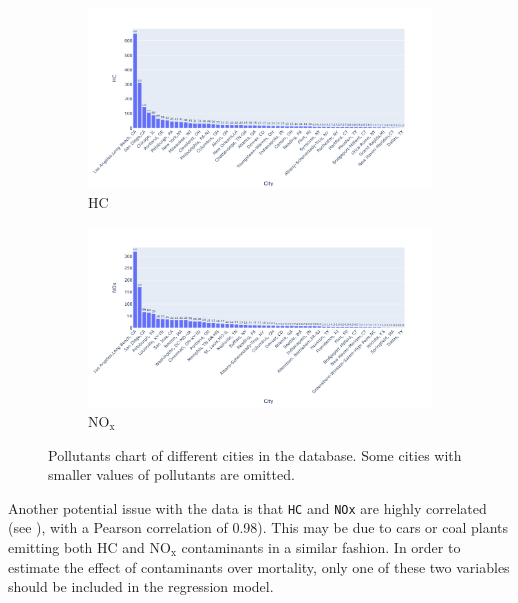 \documentclass[11pt, english]{article}
\begin{document}
\begin{figure}[H]
	\begin{subfigure}[b]{\textwidth}
         \centering
         \includegraphics[width=\textwidth]{HC_chart}
         \caption{HC}
         \label{fig:HC}
    \end{subfigure}
    
	\begin{subfigure}[b]{\textwidth}
         \centering
         \includegraphics[width=\textwidth]{NOx_chart}
         \caption{$\text{NO}_{\text{x}}$}
         \label{fig:NOx}
    \end{subfigure}
	\caption{Pollutants chart of different cities in the database. Some cities with smaller values of pollutants are omitted.}
\end{figure}


Another potential issue with the data is that \texttt{HC} and
\texttt{NOx} are highly correlated (see ), with a Pearson correlation of 0.98). This may be due to cars or coal plants emitting both HC and NO$_{\text{x}}$ contaminants in a similar fashion. In order to estimate the effect of contaminants
over mortality, only one of these two variables should be included in
the regression model.
\end{document}
